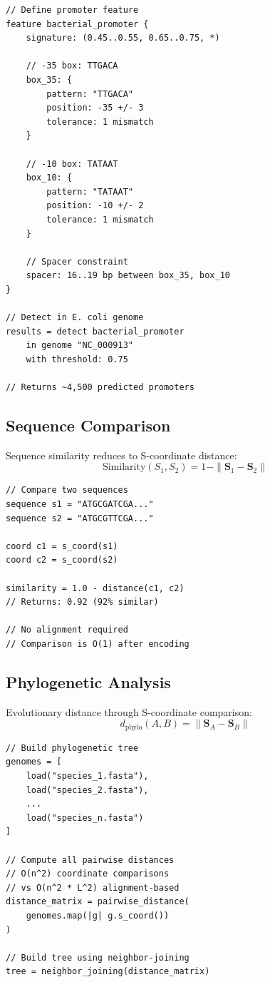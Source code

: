 \documentclass[twocolumn,10pt]{article}
\theoremstyle{remark}
\newcommand{\Scoord}{\mathbf{S}}
\begin{document}
\begin{lstlisting}[style=tritcode]
// Define promoter feature
feature bacterial_promoter {
    signature: (0.45..0.55, 0.65..0.75, *)

    // -35 box: TTGACA
    box_35: {
        pattern: "TTGACA"
        position: -35 +/- 3
        tolerance: 1 mismatch
    }

    // -10 box: TATAAT
    box_10: {
        pattern: "TATAAT"
        position: -10 +/- 2
        tolerance: 1 mismatch
    }

    // Spacer constraint
    spacer: 16..19 bp between box_35, box_10
}

// Detect in E. coli genome
results = detect bacterial_promoter
    in genome "NC_000913"
    with threshold: 0.75

// Returns ~4,500 predicted promoters
\end{lstlisting}

\subsection{Sequence Comparison}

Sequence similarity reduces to S-coordinate distance:
\begin{equation}
\text{Similarity}(S_1, S_2) = 1 - \|\Scoord_1 - \Scoord_2\|
\end{equation}

\begin{lstlisting}[style=tritcode]
// Compare two sequences
sequence s1 = "ATGCGATCGA..."
sequence s2 = "ATGCGTTCGA..."

coord c1 = s_coord(s1)
coord c2 = s_coord(s2)

similarity = 1.0 - distance(c1, c2)
// Returns: 0.92 (92% similar)

// No alignment required
// Comparison is O(1) after encoding
\end{lstlisting}

\subsection{Phylogenetic Analysis}

Evolutionary distance through S-coordinate comparison:
\begin{equation}
d_{\text{phylo}}(A, B) = \|\Scoord_A - \Scoord_B\|
\end{equation}

\begin{lstlisting}[style=tritcode]
// Build phylogenetic tree
genomes = [
    load("species_1.fasta"),
    load("species_2.fasta"),
    ...
    load("species_n.fasta")
]

// Compute all pairwise distances
// O(n^2) coordinate comparisons
// vs O(n^2 * L^2) alignment-based
distance_matrix = pairwise_distance(
    genomes.map(|g| g.s_coord())
)

// Build tree using neighbor-joining
tree = neighbor_joining(distance_matrix)
\end{lstlisting}
\end{document}
